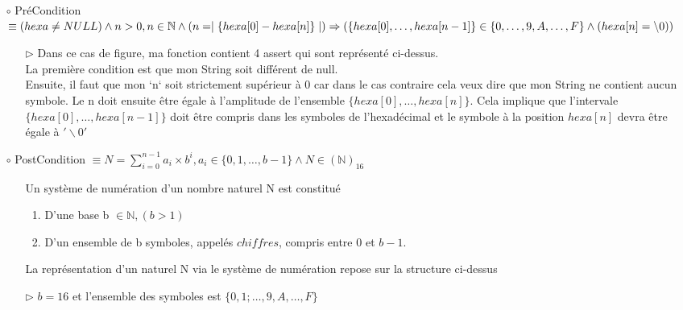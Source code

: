 \documentclass[a4paper, 11pt, oneside]{article}
\begin{document}
		\vspace{5mm}
		
		\begin{itemize}
			\item[$\circ$] PréCondition $\equiv (hexa \neq NULL) \wedge n > 0 , n \in \mathbb{N} 
			\\\wedge (n = \mid \{hexa[0] - hexa[n]\}\mid) \Rightarrow (\{hexa[0],\ldots,hexa[n-1]\} \in \{0, \ldots, 9,A,\ldots,F \} 
			\\\wedge (hexa[n] = \backslash0))$	
			
			\vspace{3mm}
			\begin{itemize}
				\item[$\triangleright$] Dans ce cas de figure, ma fonction contient 4 assert qui sont représenté ci-dessus. \\
							   La première condition est que mon String soit différent de null. \\
							   Ensuite, il faut que mon `n` soit strictement supérieur à 0 car dans le cas contraire cela veux 
							   dire que mon String ne contient aucun symbole.
							   Le n doit ensuite être égale à l'amplitude de l'ensemble $\{hexa[0],\ldots, hexa[n]\}$.
							   Cela implique que l'intervale $\{hexa[0],\ldots, hexa[n-1]\}$ doit être compris dans les symboles 
							   de l'hexadécimal et le symbole à la position $hexa[n]$ devra être égale à $'\backslash0'$ 						
			\end{itemize}
			\vspace{5mm}
			
			\item[$\circ$] PostCondition $\equiv N = \sum_{i=0}^{n-1} a_i \times b^i , a_i \in \{0,1,\ldots,b-1\} \wedge N \in (\mathbb{N})_{16}$
				
			\vspace{3mm}
			\begin{itemize}
				\item[] Un système de numération d’un nombre naturel N est constitué
				\begin{enumerate}
					\item D'une base b $\in \mathbb{N} , (b > 1)$ 
					\item D'un ensemble de b symboles, appelés $chiffres$, compris entre $0$ et $b-1$.
				\end{enumerate}						
				\item[] La représentation d'un naturel N via le système de numération repose sur la structure ci-dessus
				\item[$\triangleright$] $b = 16$ et l'ensemble des symboles est $\{0,1;\ldots,9,A,\ldots,F\}$  
			\end{itemize}
		\end{itemize}
		
\end{document}
